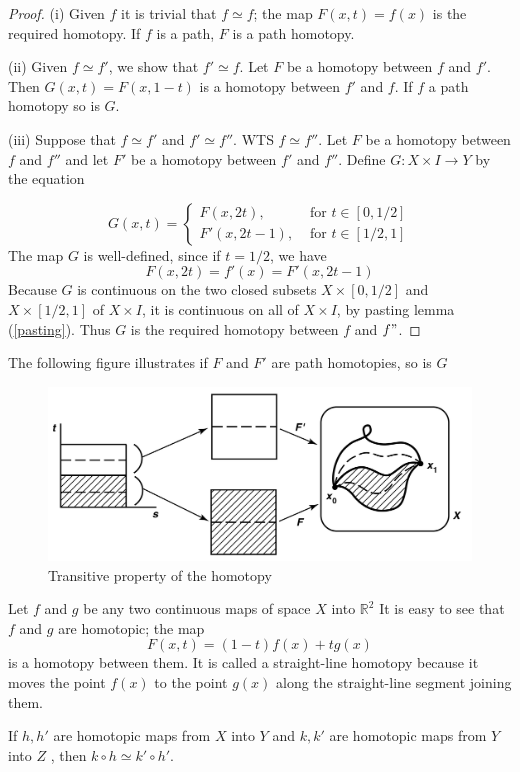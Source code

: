 \begin{proof}
(i) Given $f$ it is trivial that $f\simeq f$; the map $F(x,t)=f(x)$ is the required homotopy. If $f$ is a path, $F$ is a path homotopy.

(ii) Given $f\simeq f'$, we show that $f'\simeq f$. Let $F$ be a homotopy between $f$ and $f'$. Then $G(x,t)=F(x,1-t)$ is a homotopy between $f'$ and $f$. If $f$ a path homotopy  so is $G$.

(iii) Suppose that $f\simeq f'$ and $f'\simeq f''$. WTS $f\simeq f''$. Let $F$ be a homotopy between $f$ and $f''$ and let $F'$ be a homotopy between $f'$ and $f''$. Define $G:X\times I\rightarrow Y$ by the equation

$$
G(x,t)=
\begin{cases}
F(x,2t),&\mbox{ for }t\in[0,1/2]\\
F'(x,2t-1),&\mbox{ for }t\in[1/2,1]
\end{cases}
$$
The map $G$ is well-defined, since if $t=1/2$, we have
$$ F(x,2t)=f'(x)=F'(x,2t-1)$$
Because $G$ is continuous on the two closed subsets $X\times[0,1/2]$ and $X\times[1/2,1]$ of $X\times I$, it is continuous on all of $X\times I$, by pasting lemma (\ref{pasting}). Thus $G$ is the required homotopy between $f$ and $f"$.
\end{proof}
\medskip
The following figure illustrates if $F$ and $F'$ are path homotopies, so is $G$
\begin{figure}[hbt!]
\centering
\includegraphics[width=.8\textwidth]{./images/equiv.jpg}
\caption{Transitive property of the homotopy}
\end{figure}


\begin{example}
Let $f$ and $g$ be any two continuous maps of space $X$ into $\mathbb{R}^2$ It is easy to see that $f$ and $g$ are homotopic; the map
$$
F(x,t)=(1-t)f(x)+tg(x)
$$
is a homotopy between them. It is called a straight-line homotopy because it moves the point $f(x)$ to the point $g(x)$ along the straight-line segment joining them.
\end{example}
\begin{prop}\label{homocomp}
If $h, h'$ are homotopic maps from $X$ into $Y$ and $k, k'$ are homotopic maps from $Y$ into $Z$ , then $k\circ h \simeq k' \circ h'$.
\end{prop}



